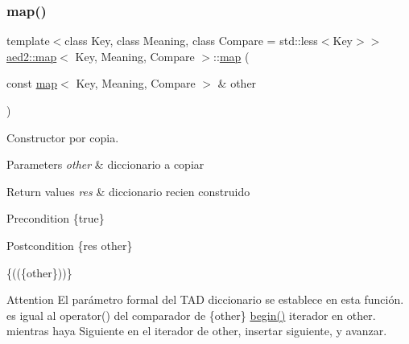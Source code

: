 \subsubsection{\texorpdfstring{map()}{map()}\hspace{0.1cm}{\footnotesize\ttfamily [2/6]}}
{\footnotesize\ttfamily template$<$class Key, class Meaning, class Compare = std\+::less$<$\+Key$>$$>$ \\
\hyperlink{classaed2_1_1map}{aed2\+::map}$<$ Key, Meaning, Compare $>$\+::\hyperlink{classaed2_1_1map}{map} (\begin{DoxyParamCaption}\item[{const \hyperlink{classaed2_1_1map}{map}$<$ Key, Meaning, Compare $>$ \&}]{other }\end{DoxyParamCaption})\hspace{0.3cm}{\ttfamily [inline]}}



Constructor por copia. 


\begin{DoxyParams}{Parameters}
{\em other} & diccionario a copiar \\
\hline
\end{DoxyParams}

\begin{DoxyRetVals}{Return values}
{\em res} & diccionario recien construido\\
\hline
\end{DoxyRetVals}
\begin{DoxyPrecond}{Precondition}
\{true\} 
\end{DoxyPrecond}
\begin{DoxyPostcond}{Postcondition}
\{res  other\}
\end{DoxyPostcond}
\{((\{other\}))\}

\begin{DoxyAttention}{Attention}
El parámetro formal  del T\+AD diccionario se establece en esta función.  es igual al operator() del comparador de \{other\} \hyperlink{classaed2_1_1map_a58a95705d54b3dda7f775ce5a22225cb}{begin()} iterador en other. mientras haya Siguiente en el iterador de other, insertar siguiente, y avanzar. 
\end{DoxyAttention}
\mbox{\label{classaed2_1_1map_a5d336f3248572beb56be383dcc95cfeb}} 
